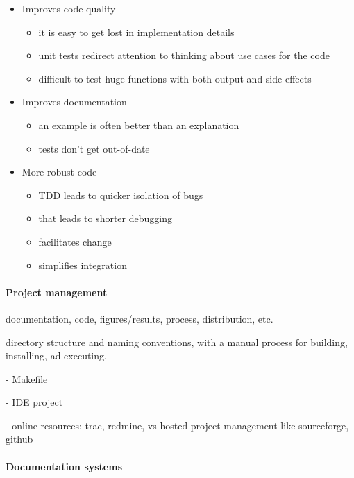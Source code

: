 \documentclass[ChapterTOCs,krantz2]{krantz} %
\begin{document}
\begin{itemize}

\item Improves code quality

\begin{itemize}
\item it is easy to get lost in implementation details
\item unit tests redirect attention to thinking about use cases for the code
\item difficult to test huge functions with both output and side effects
\end{itemize}

\item Improves documentation
\begin{itemize}
\item an example is often better than an explanation
\item tests don't get out-of-date
\end{itemize}

\item More robust code

\begin{itemize}
\item TDD leads to quicker isolation of bugs
\item that leads to shorter debugging
\item facilitates change
\item simplifies integration
\end{itemize}

\end{itemize}
\paragraph{ {\bf Project management}}

documentation, code, figures/results, process, distribution, etc.

directory structure and naming conventions, with a manual process
for building, installing, ad executing.

- Makefile

- IDE project

- online resources: trac, redmine, vs hosted project management like
sourceforge, github

\paragraph{ {\bf Documentation systems}}
\end{document}
